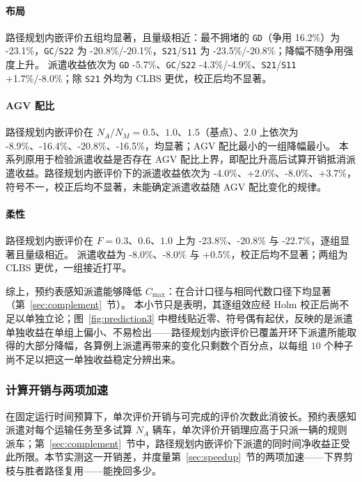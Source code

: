 \documentclass[manuscript,screen,review]{acmart}
\newcommand{\NSeeds}{10}
\newcommand{\GainLoopStarve}{-8.9\%}     %
\newcommand{\GainProbeStarve}{-4.0\%}     %
\newcommand{\GainProbeFleetBase}{-8.0\%} %
\newcommand{\GainProbeFleetOne}{+2.0\%}  %
\newcommand{\GainProbeFleetTwo}{+3.7\%}  %
\newcommand{\GainLoopFunnel}{-20.8\%}    %
\newcommand{\GainLoopHigh}{-23.5\%}      %
\newcommand{\GainLoopMid}{-20.1\%}       %
\newcommand{\GainLoopLow}{-20.8\%}       %
\newcommand{\GainLoopScatter}{-23.1\%}    %
\newcommand{\GainLoopFleetOne}{-16.4\%}  %
\newcommand{\GainLoopFleetTwo}{-16.5\%}  %
\newcommand{\GainLoopFlexLo}{-23.8\%}    %
\newcommand{\GainLoopFlexHi}{-22.7\%}    %
\newcommand{\GainProbeFlexLo}{-8.0\%}    %
\newcommand{\GainProbeFlexHi}{+0.5\%}    %
\newcommand{\GainProbeFunnel}{-8.0\%}    %
\newcommand{\GainProbeHigh}{+1.7\%}      %
\newcommand{\GainProbeMid}{-4.9\%}       %
\newcommand{\GainProbeLow}{-4.3\%}       %
\newcommand{\GainProbeScatter}{-5.7\%}   %
\newcommand{\ContentionLo}{16.2\%}
\begin{document}
\paragraph{布局}
路径规划内嵌评价五组均显著，且量级相近：最不拥堵的 \texttt{GD}（争用 \ContentionLo{}）为 \GainLoopScatter{}，\texttt{GC}/\texttt{S22} 为 \GainLoopLow{}/\GainLoopMid{}，\texttt{S21}/\texttt{S11} 为 \GainLoopHigh{}/\GainLoopFunnel{}；降幅不随争用强度上升。
派遣收益依次为 \texttt{GD} \GainProbeScatter{}、\texttt{GC}/\texttt{S22} \GainProbeLow{}/\GainProbeMid{}、\texttt{S21}/\texttt{S11} \GainProbeHigh{}/\GainProbeFunnel{}；除 \texttt{S21} 外均为 CLBS 更优，校正后均不显著。

\paragraph{AGV 配比}
路径规划内嵌评价在 $N_A/N_M=0.5$、$1.0$、$1.5$（基点）、$2.0$ 上依次为 \GainLoopStarve{}、\GainLoopFleetOne{}、\GainLoopFunnel{}、\GainLoopFleetTwo{}，均显著；AGV 配比最小的一组降幅最小。
本系列原用于检验派遣收益是否存在 AGV 配比上界，即配比升高后试算开销抵消派遣收益。路径规划内嵌评价下的派遣收益依次为 \GainProbeStarve{}、\GainProbeFleetOne{}、\GainProbeFleetBase{}、\GainProbeFleetTwo{}，符号不一，校正后均不显著，未能确定派遣收益随 AGV 配比变化的规律。

\paragraph{柔性}
路径规划内嵌评价在 $F=0.3$、$0.6$、$1.0$ 上为 \GainLoopFlexLo{}、\GainLoopFunnel{} 与 \GainLoopFlexHi{}，逐组显著且量级相近。
派遣收益为 \GainProbeFlexLo{}、\GainProbeFleetBase{} 与 \GainProbeFlexHi{}，校正后均不显著；两组为 CLBS 更优，一组接近打平。

综上，预约表感知派遣能够降低 $C_{\max}$：在合计口径与相同代数口径下均显著（第~\ref{sec:complement}~节）。
本小节只是表明，其逐组效应经 Holm 校正后尚不足以单独立论；图~\ref{fig:prediction3} 中橙线贴近零、符号偶有起伏，反映的是派遣单独收益在单组上偏小、不易检出——路径规划内嵌评价已覆盖开环下派遣所能取得的大部分降幅，各算例上派遣再带来的变化只剩数个百分点，以每组 $\NSeeds$ 个种子尚不足以把这一单独收益稳定分辨出来。

\subsubsection{计算开销与两项加速}
\label{sec:costlaw}

在固定运行时间预算下，单次评价开销与可完成的评价次数此消彼长。预约表感知派遣对每个运输任务至多试算 $N_A$ 辆车，单次评价开销理应高于只派一辆的规则派车；第~\ref{sec:complement}~节中，路径规划内嵌评价下派遣的同时间净收益正受此所限。本节实测这一开销差，并度量第~\ref{sec:speedup}~节的两项加速——下界剪枝与胜者路径复用——能挽回多少。
\end{document}
